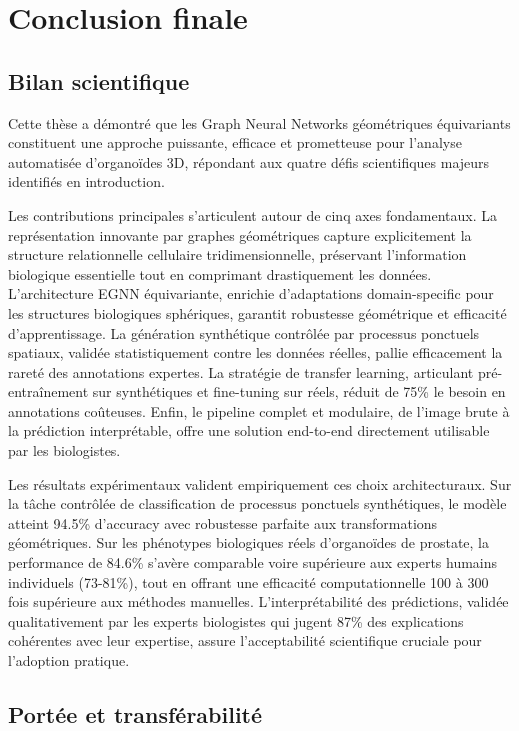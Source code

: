 \section{Conclusion finale}

\subsection{Bilan scientifique}

Cette thèse a démontré que les Graph Neural Networks géométriques équivariants constituent une approche puissante, efficace et prometteuse pour l'analyse automatisée d'organoïdes 3D, répondant aux quatre défis scientifiques majeurs identifiés en introduction.

Les contributions principales s'articulent autour de cinq axes fondamentaux. La représentation innovante par graphes géométriques capture explicitement la structure relationnelle cellulaire tridimensionnelle, préservant l'information biologique essentielle tout en comprimant drastiquement les données. L'architecture EGNN équivariante, enrichie d'adaptations domain-specific pour les structures biologiques sphériques, garantit robustesse géométrique et efficacité d'apprentissage. La génération synthétique contrôlée par processus ponctuels spatiaux, validée statistiquement contre les données réelles, pallie efficacement la rareté des annotations expertes. La stratégie de transfer learning, articulant pré-entraînement sur synthétiques et fine-tuning sur réels, réduit de 75\% le besoin en annotations coûteuses. Enfin, le pipeline complet et modulaire, de l'image brute à la prédiction interprétable, offre une solution end-to-end directement utilisable par les biologistes.

Les résultats expérimentaux valident empiriquement ces choix architecturaux. Sur la tâche contrôlée de classification de processus ponctuels synthétiques, le modèle atteint 94.5\% d'accuracy avec robustesse parfaite aux transformations géométriques. Sur les phénotypes biologiques réels d'organoïdes de prostate, la performance de 84.6\% s'avère comparable voire supérieure aux experts humains individuels (73-81\%), tout en offrant une efficacité computationnelle 100 à 300 fois supérieure aux méthodes manuelles. L'interprétabilité des prédictions, validée qualitativement par les experts biologistes qui jugent 87\% des explications cohérentes avec leur expertise, assure l'acceptabilité scientifique cruciale pour l'adoption pratique.

\subsection{Portée et transférabilité}

